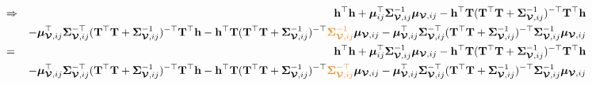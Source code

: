 \documentclass[12pt]{article}
\newcommand{\0}{\mathbf{0}}
\begin{document}
\begin{eqnarray*}
& \Rightarrow & \mathbf{h}^{\top} \mathbf{h} + \boldsymbol{\mu}_{ij}^{\top} \boldsymbol{\Sigma}_{\boldsymbol{\mathcal{V}}, ij}^{-1} \boldsymbol{\mu}_{\boldsymbol{\mathcal{V}}, ij}  -  \mathbf{h}^{\top} \mathbf{T} ( \mathbf{T}^{\top} \mathbf{T} + \boldsymbol{\Sigma}_{\boldsymbol{\mathcal{V}}, ij}^{-1} )^{-\top} \mathbf{T}^{\top} \mathbf{h} \\
&& - \boldsymbol{\mu}_{\boldsymbol{\mathcal{V}}, ij}^{\top}  \boldsymbol{\Sigma}_{\boldsymbol{\mathcal{V}}, ij}^{-\top} ( \mathbf{T}^{\top} \mathbf{T} + \boldsymbol{\Sigma}_{\boldsymbol{\mathcal{V}}, ij}^{-1} )^{-\top} \mathbf{T}^{\top} \mathbf{h} -  \mathbf{h}^{\top} \mathbf{T} ( \mathbf{T}^{\top} \mathbf{T} + \boldsymbol{\Sigma}_{\boldsymbol{\mathcal{V}}, ij}^{-1} )^{-\top} \textcolor{kaustorange}{\boldsymbol{\Sigma}_{\boldsymbol{\mathcal{V}}, ij}^{-1}} \boldsymbol{\mu}_{\boldsymbol{\mathcal{V}}, ij}  -  \boldsymbol{\mu}_{\boldsymbol{\mathcal{V}}, ij}^{\top}  \boldsymbol{\Sigma}_{\boldsymbol{\mathcal{V}}, ij}^{-\top}  ( \mathbf{T}^{\top} \mathbf{T} + \boldsymbol{\Sigma}_{\boldsymbol{\mathcal{V}}, ij}^{-1} )^{-\top} \boldsymbol{\Sigma}_{\boldsymbol{\mathcal{V}}, ij}^{-1}\boldsymbol{\mu}_{\boldsymbol{\mathcal{V}}, ij}  \\
& = & \mathbf{h}^{\top} \mathbf{h} + \boldsymbol{\mu}_{ij}^{\top} \boldsymbol{\Sigma}_{\boldsymbol{\mathcal{V}}, ij}^{-1} \boldsymbol{\mu}_{\boldsymbol{\mathcal{V}}, ij} -  \mathbf{h}^{\top} \mathbf{T} ( \mathbf{T}^{\top} \mathbf{T} + \boldsymbol{\Sigma}_{\boldsymbol{\mathcal{V}}, ij}^{-1} )^{-\top} \mathbf{T}^{\top} \mathbf{h} \\
&& - \boldsymbol{\mu}_{\boldsymbol{\mathcal{V}}, ij}^{\top}  \boldsymbol{\Sigma}_{\boldsymbol{\mathcal{V}}, ij}^{-\top} ( \mathbf{T}^{\top} \mathbf{T} + \boldsymbol{\Sigma}_{\boldsymbol{\mathcal{V}}, ij}^{-1} )^{-\top} \mathbf{T}^{\top} \mathbf{h} -  \mathbf{h}^{\top} \mathbf{T} ( \mathbf{T}^{\top} \mathbf{T} + \boldsymbol{\Sigma}_{\boldsymbol{\mathcal{V}}, ij}^{-1} )^{-\top} \textcolor{kaustorange}{\boldsymbol{\Sigma}_{\boldsymbol{\mathcal{V}}, ij}^{-\top}} \boldsymbol{\mu}_{\boldsymbol{\mathcal{V}}, ij} -  \boldsymbol{\mu}_{\boldsymbol{\mathcal{V}}, ij}^{\top}  \boldsymbol{\Sigma}_{\boldsymbol{\mathcal{V}}, ij}^{-\top}  ( \mathbf{T}^{\top} \mathbf{T} + \boldsymbol{\Sigma}_{\boldsymbol{\mathcal{V}}, ij}^{-1} )^{-\top} \boldsymbol{\Sigma}_{\boldsymbol{\mathcal{V}}, ij}^{-1}\boldsymbol{\mu}_{\boldsymbol{\mathcal{V}}, ij} 
\end{eqnarray*}
\end{document}
